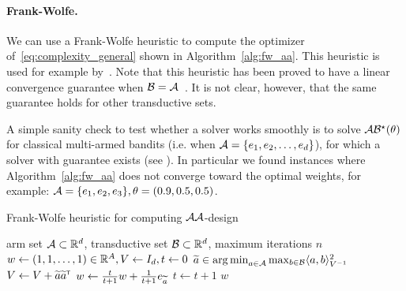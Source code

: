\paragraph{Frank-Wolfe.} We can use a Frank-Wolfe heuristic to compute the optimizer of~\eqref{eq:complexity_general} shown in Algorithm~\ref{alg:fw_aa}. This heuristic is used for example by~\citet{fiez2019transductive}. Note that this heuristic has been proved to have a linear convergence guarantee when $\mathcal{B} = \mathcal{A}$~\citep{ahipasaoglu2008fw}. It is not clear, however, that the same guarantee holds for other transductive sets.

A simple sanity check to test whether a solver works smoothly is  to solve $\mathcal{A}\mathcal{B}^\star(\theta)$ for classical multi-armed bandits (i.e. when $\mathcal{A}= \{e_1,e_2,\ldots,e_d\}$), for which a solver with guarantee exists (see \citealt{garivier2018explore}). In particular we found instances where Algorithm~\ref{alg:fw_aa} does not converge toward the optimal weights, for example: $\mathcal{A}= \{e_1,e_2,e_3\}, \theta = (0.9, 0.5, 0.5)$.



\begin{algorithm}[ht]
\centering
\caption{Frank-Wolfe heuristic for computing $\mathcal{A}\mathcal{A}$-design}
\label{alg:fw_aa}
\begin{algorithmic}
    arm set $\mathcal{A}\subset\mathbb{R}^d$, transductive set $\mathcal{B}\subset\mathbb{R}^d$, maximum iterations $n$
    $w \leftarrow{} (1, 1, \ldots, 1)\in\mathbb{R}^A, V \leftarrow{} I_d, t \leftarrow{} 0$
        \State $\widetilde{a}\in\operatorname*{arg\,min}_{a\in\mathcal{A}}\max_{b\in\mathcal{B}}\langle a,b\rangle_{V^{-1}}^2$%
        \State $V \leftarrow{} V + \widetilde{a} \widetilde{a}^{\mathsf{\scriptscriptstyle T}}$
        \State $w \leftarrow{} \frac{t}{t+1}w+\frac{1}{t+1}e_{\widetilde{a}}$
        \State $t \leftarrow{} t+1$
   \EndWhile
    $w$
\end{algorithmic}
\end{algorithm}

